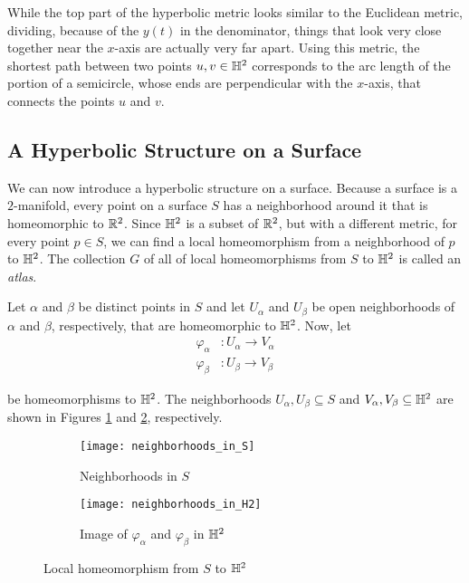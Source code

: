 \documentclass{amsart}
\begin{document}
	While the top part of the hyperbolic metric looks similar to the Euclidean metric, dividing, because of the $y(t)$ in the denominator, things that look very close together near the $x$-axis are actually very far apart. Using this metric, the shortest path between two points $u,v \in \mathbb{H}^2$ corresponds to the arc length of the portion of a semicircle, whose ends are perpendicular with the $x$-axis, that connects the points $u$ and $v$.
	
	\subsection{A Hyperbolic Structure on a Surface}
	
	We can now introduce a hyperbolic structure on a surface. Because a surface is a $2$-manifold, every point on a surface $S$ has a neighborhood around it that is homeomorphic to $\mathbb{R}^2$. Since $\mathbb{H}^2$ is a subset of $\mathbb{R}^2$, but with a different metric, for every point $p \in S$, we can find a local homeomorphism from a neighborhood of $p$ to $\mathbb{H}^2$. The collection $G$ of all of local homeomorphisms from $S$ to $\mathbb{H}^2$ is called an \emph{atlas}.
	
	Let $\alpha$ and $\beta$ be distinct points in $S$ and let $U_\alpha$ and $U_\beta$ be open neighborhoods of $\alpha$ and $\beta$, respectively, that are homeomorphic to $\mathbb{H}^2$. Now, let
	\begin{equation*}
		\begin{split}
			\varphi_\alpha & \colon U_\alpha \to V_\alpha \\
			\varphi_\beta & \colon U_\beta \to V_\beta
		\end{split}
	\end{equation*}
	
	be homeomorphisms to $\mathbb{H}^2$. The neighborhoods $U_\alpha, U_\beta \subseteq S$ and $V_\alpha, V_\beta \subseteq \mathbb{H}^2$ are shown in Figures \ref{fig:neighborhoods_in_S} and \ref{fig:neighborhoods_in_H2}, respectively.
	
	\begin{figure}[h]
		\begin{subfigure}{.45\textwidth}
			\texttt{[image: neighborhoods\_in\_S]}	
			\caption{Neighborhoods in $S$}
			\label{fig:neighborhoods_in_S}
		\end{subfigure}
		\hfill
		\begin{subfigure}{.45\textwidth}
			\texttt{[image: neighborhoods\_in\_H2]}
			\caption{Image of $\varphi_\alpha$ and $\varphi_\beta$ in $\mathbb{H}^2$}
			\label{fig:neighborhoods_in_H2}
		\end{subfigure}
		\caption{Local homeomorphism from $S$ to $\mathbb{H}^2$}
		\label{fig:local_homeomorphisms}
	\end{figure}
	
\end{document}
